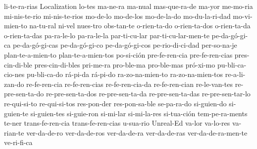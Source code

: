 {li-te-ra-rias
Localization
lo-tes
ma-ne-ra
ma-nual
mas-que-ra-de
ma-yor
me-mo-ria
mi-nis-te-rio
mi-nis-te-rios
mo-de-lo
mo-de-los
mo-de-la-do
mo-du-la-ri-dad
mo-vi-mien-to
na-tu-ral
ni-vel
nues-tro
obs-tan-te
o-rien-ta-do
o-rien-ta-dos
o-rien-ta-da
o-rien-ta-das
pa-ra-le-lo
pa-ra-le-la
par-ti-cu-lar
par-ti-cu-lar-men-te
pe-da-gó-gi-ca
pe-da-gó-gi-cas
pe-da-gó-gi-co
pe-da-gó-gi-cos
pe-rio-di-ci-dad
per-so-na-je
plan-te-a-mien-to
plan-te-a-mien-tos
po-si-ción
pre-fe-ren-cia
pre-fe-ren-cias
pres-cin-di-ble
pres-cin-di-bles
pri-me-ra
pro-ble-ma
pro-ble-mas
pró-xi-mo
pu-bli-ca-cio-nes
pu-bli-ca-do
rá-pi-da
rá-pi-do
ra-zo-na-mien-to
ra-zo-na-mien-tos
re-a-li-zan-do
re-fe-ren-cia
re-fe-ren-cias
re-fe-ren-cia-da
re-fe-ren-cian
re-le-van-tes
re-pre-sen-ta-do
re-pre-sen-ta-dos
re-pre-sen-ta-da
re-pre-sen-ta-das
re-pre-sen-tar-lo
re-qui-si-to
re-qui-si-tos
res-pon-der
res-pon-sa-ble
se-pa-ra-do
si-guien-do
si-guien-te
si-guien-tes
si-guie-ron
si-mi-lar
si-mi-la-res
si-tua-ción
tem-pe-ra-ments
te-ner
trans-fe-ren-cia
trans-fe-ren-cias
u-sua-rio
Unreal-Ed
va-lor
va-lo-res
va-rian-te
ver-da-de-ro
ver-da-de-ros
ver-da-de-ra
ver-da-de-ras
ver-da-de-ra-men-te
ve-ri-fi-ca
}
